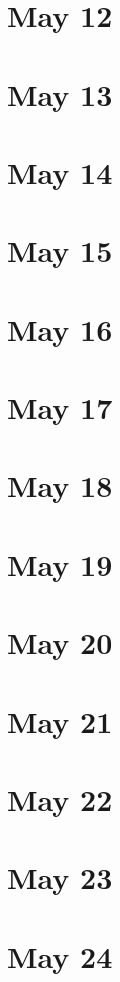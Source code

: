 \section{May 12}

\section{May 13}

\section{May 14}

\section{May 15}

\section{May 16}

\section{May 17}

\section{May 18}

\section{May 19}

\section{May 20}

\section{May 21}

\section{May 22}

\section{May 23}

\section{May 24}

